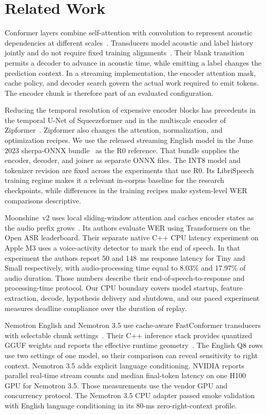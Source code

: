 \documentclass[conference]{IEEEtran}
\begin{document}
\section{Related Work}

Conformer layers combine self-attention with convolution to represent acoustic
dependencies at different scales~\cite{gulati2020conformer}. Transducers model
acoustic and label history jointly and do not require fixed training
alignments~\cite{graves2012transduction}. Their blank transition permits a
decoder to advance in acoustic time, while emitting a label changes the
prediction context. In a streaming implementation, the encoder attention mask,
cache policy, and decoder search govern the actual work required to emit tokens.
The encoder chunk is therefore part of an evaluated configuration.

Reducing the temporal resolution of expensive encoder blocks has precedents
in the temporal U-Net of Squeezeformer and in the multiscale encoder of
Zipformer~\cite{kim2022squeezeformer,yao2024zipformer}. Zipformer also changes
the attention, normalization, and optimization recipes. We use the released
streaming English model in the June 2023 sherpa-ONNX bundle~\cite{zipformermodel}
as the R0 reference. That bundle supplies the encoder, decoder, and joiner as
separate ONNX files. The INT8 model and tokenizer revision are fixed across
the experiments that use R0. Its LibriSpeech training regime makes it a relevant
in-corpus baseline for the research checkpoints, while differences in the training
recipes make system-level WER comparisons descriptive.

Moonshine~v2 uses local sliding-window attention and caches encoder states
as the audio prefix grows~\cite{kudlur2026moonshine}. Its authors evaluate
WER using Transformers on the Open ASR leaderboard. Their separate native
C++ CPU latency experiment on Apple M3 uses a voice-activity detector to mark
the end of speech. In that experiment the authors report 50 and 148~ms
response latency for Tiny and Small respectively, with audio-processing time
equal to 8.03\% and 17.97\% of audio duration. Those numbers describe their
end-of-speech-to-response and processing-time protocol. Our CPU boundary
covers model startup, feature extraction, decode, hypothesis delivery and
shutdown, and our paced experiment measures deadline compliance over the
duration of replay.

Nemotron English and Nemotron 3.5 use cache-aware FastConformer transducers
with selectable chunk settings~\cite{noroozi2024stateful,nemotronen,nemotron35}.
Their C++ inference stack provides quantized GGUF weights and reports the
effective runtime geometry~\cite{nemoasr}. The English Q8 rows use two settings
of one model, so their comparison can reveal sensitivity to right context.
Nemotron 3.5 adds explicit language conditioning. NVIDIA reports parallel
real-time stream counts and median final-token latency on one H100 GPU for
Nemotron 3.5. Those measurements use the vendor GPU and concurrency
protocol. The Nemotron 3.5 CPU adapter passed smoke validation with English
language conditioning in its 80-ms zero-right-context profile.
\end{document}
